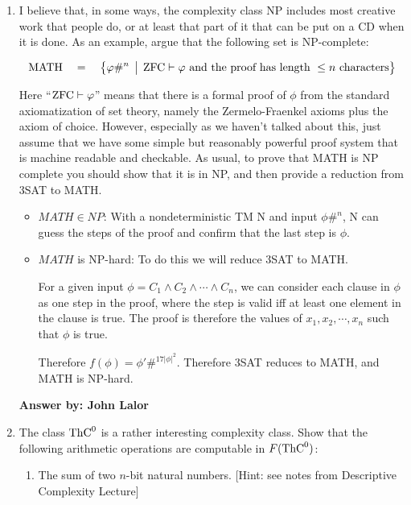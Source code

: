 \documentclass[12pt]{article}
\begin{document}
\noindent{}
\addtocounter{section}{1}

\begin{enumerate}

\item I believe that, in some ways, the complexity class NP includes most creative work that
  people do, or at least that part of it that can be put on a CD when it is
  done.  As an example, argue that the following set is NP-complete:

  \[ \mbox{MATH}\quad =\quad \bigl\{ \varphi \#^n \,\bigm|\, \mbox{ZFC}\vdash\varphi \mbox{ and the
      proof has length } \leq n \mbox{ characters} \bigr\}\]

  Here ``$\mbox{ZFC}\vdash\varphi$'' means that there is a formal proof of $\phi$ from the standard
  axiomatization
  of set theory, namely the Zermelo-Fraenkel axioms plus the axiom of choice.  However, especially as
  we haven't talked about this, just assume that we have some simple but reasonably powerful
  proof system that is machine readable and checkable.  As usual, to prove that MATH is NP complete
  you should show that it is in NP, and then provide a reduction from 3SAT to MATH.

  \begin{itemize}
  \item $MATH \in NP$: With a nondeterministic TM N and input $\phi \#^n$, N can guess the steps of the proof and confirm that the last step is $\phi$.
  \item $MATH$ is NP-hard: To do this we will reduce 3SAT to MATH.

    For a given input $\phi = C_1 \land C_2 \land \cdots \land C_n$, we can consider each clause in $\phi$ as one step in the proof, where the step is valid iff at least one element in the clause is true. The proof is therefore the values of $x_1,x_2,\cdots ,x_n$ such that $\phi$ is true.

    Therefore $f(\phi) = \phi\prime \#^{17|\phi|^2}$. Therefore 3SAT reduces to MATH, and MATH is NP-hard.
  \end{itemize}
  
   {\bf Answer by: John Lalor} 


\item The class $\mbox{{\rm ThC}}^0$ is a rather interesting complexity class.  Show
  that the following arithmetic operations are computable in $F(\mbox{{\rm ThC}}^0)$:
  \begin{enumerate}
  \item The sum of two $n$-bit natural numbers.  [Hint: see notes from Descriptive Complexity Lecture]


\end{enumerate}
\end{enumerate}
\end{document}
